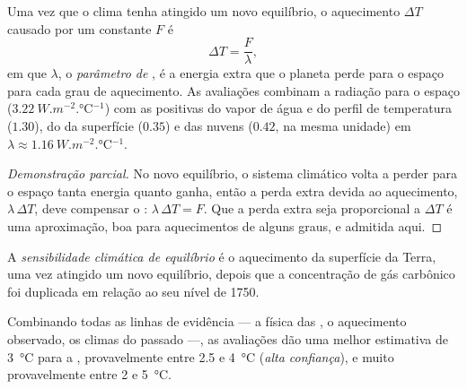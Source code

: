 \begin{proposition}\label{prop:g12:climate-change:equilibrium}
Uma vez que o clima tenha atingido um novo equilíbrio, o aquecimento
$\Delta T$ causado por um  constante $F$ é
\[
  \Delta T = \frac{F}{\lambda},
\]
em que $\lambda$, o \emph{parâmetro de }, é a
energia extra que o planeta perde para o espaço para cada grau de
aquecimento. As avaliações combinam a radiação para o espaço
($\qty{3.22}{W.m^{-2}.\degreeCelsius^{-1}}$) com as 
positivas do vapor de água e do perfil de temperatura ($1.30$), do  da
superfície ($0.35$) e das nuvens ($0.42$, na mesma unidade) em
$\lambda \approx \qty{1.16}{W.m^{-2}.\degreeCelsius^{-1}}$.
\end{proposition}

\begin{proof}[Demonstração parcial]
No novo equilíbrio, o sistema climático volta a perder para o espaço tanta
energia quanto ganha, então a perda extra devida ao aquecimento,
$\lambda\,\Delta T$, deve compensar o : $\lambda\,\Delta T = F$.
Que a perda extra seja proporcional a $\Delta T$ é uma aproximação, boa para
aquecimentos de alguns graus, e admitida aqui.
\end{proof}

\begin{definition}\label{def:g12:climate-change:ecs}
A \emph{sensibilidade climática de equilíbrio}
é o aquecimento da superfície da Terra, uma vez atingido um novo equilíbrio,
depois que a concentração de gás carbônico foi duplicada em relação ao seu
nível de 1750.
\end{definition}

\begin{proposition}\label{prop:g12:climate-change:ecs}
Combinando todas as linhas de evidência --- a física das ,
o aquecimento observado, os climas do passado ---, as avaliações dão uma
melhor estimativa de \qty{3}{\degreeCelsius} para a , provavelmente entre 2.5 e \qty{4}{\degreeCelsius}
(\emph{alta confiança}), e muito provavelmente entre 2 e
\qty{5}{\degreeCelsius}.
\end{proposition}

